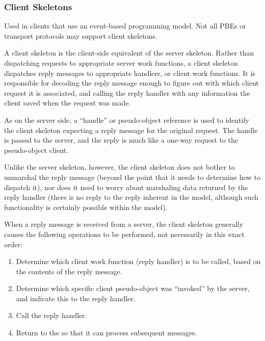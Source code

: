 

\subsubsection{Client Skeletons}

Used in clients that use an event-based programming model.  Not all PBEs or
transport protocols may support client skeletons.

A client skeleton is the client-side equivalent of the server skeleton.  Rather
than dispatching requests to appropriate server work functions, a client
skeleton dispatches reply messages to appropriate handlers, or client work
functions.  It is responsible for decoding the reply message enough to figure
out with which client request it is associated, and calling the reply handler
with any information the client saved when the request was made.

As on the server side, a ``handle'' or pseudo-object reference is used to
identify the client skeleton expecting a reply message for the original
request.  The handle is passed to the server, and the reply is much like a
one-way request to the pseudo-object client.

Unlike the server skeleton, however, the client skeleton does not bother to
unmarshal the reply message (beyond the point that it needs to determine how to
dispatch it), nor does it need to worry about marshaling data returned by the
reply handler (there is no reply to the reply inherent in the model, although
such functionality is certainly possible within the model).

When a reply message is received from a server, the client skeleton generally
causes the following operations to be performed, not necessarily in this exact
order:

\begin{enumerate}
  \item Determine which client work function (reply handler) is to be called,
  based on the contents of the reply message.

  \item Determine which specific client pseudo-object was ``invoked'' by the
  server, and indicate this to the reply handler.

  \item Call the reply handler.

  \item Return to the \ORB{} so that it can process subsequent messages.
\end{enumerate}

